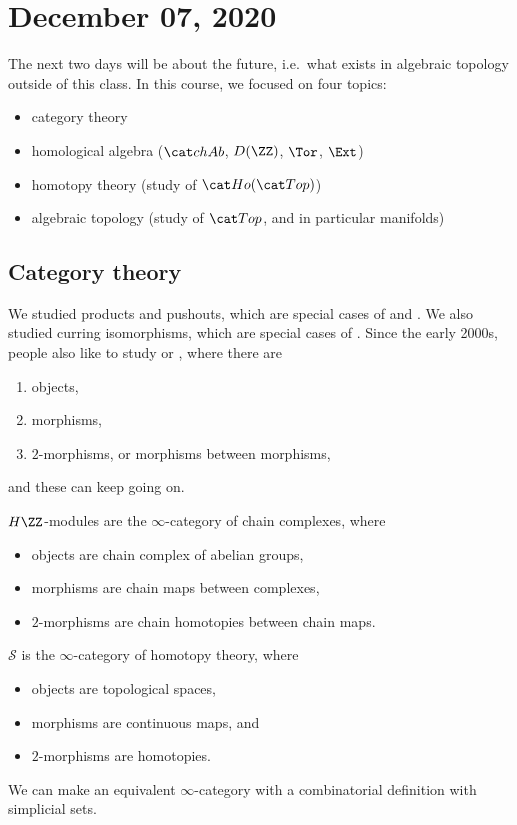 \documentclass{standalone}
\begin{document}
\chapter{December 07, 2020}

The next two days will be about the future,
i.e.\ what exists in algebraic topology outside of this class.
In this course, we focused on four topics:
\begin{itemize}[nosep]
  \item category theory
  \item homological algebra (\(\cchAb\), \(D(\ZZ)\), \(\Tor\), \(\Ext\))
  \item homotopy theory (study of \(\cHoTop\))
  \item algebraic topology (study of \(\cTop\), and in particular manifolds)
\end{itemize}

\section{Category theory}
We studied products and pushouts,
  which are special cases of  and .
We also studied curring isomorphisms,
  which are special cases of .
Since the early 2000s, people also like to study
   or , where there are
\begin{enumerate}
  \item objects,
  \item morphisms,
  \item \(2\)-morphisms, or morphisms between morphisms,
\end{enumerate}
and these can keep going on.

\begin{example}
  \(H\ZZ\)-modules are the \(\infty\)-category of chain complexes, where
  \begin{itemize}
    \item objects are chain complex of abelian groups,
    \item morphisms are chain maps between complexes,
    \item \(2\)-morphisms are chain homotopies between chain maps.
  \end{itemize}
\end{example}

\begin{example}
  \(\mathcal S\) is the \(\infty\)-category of homotopy theory, where
  \begin{itemize}
    \item objects are topological spaces,
    \item morphisms are continuous maps, and
    \item \(2\)-morphisms are homotopies.
  \end{itemize}

  We can make an equivalent \(\infty\)-category with
  a combinatorial definition with simplicial sets.
\end{example}
\end{document}

